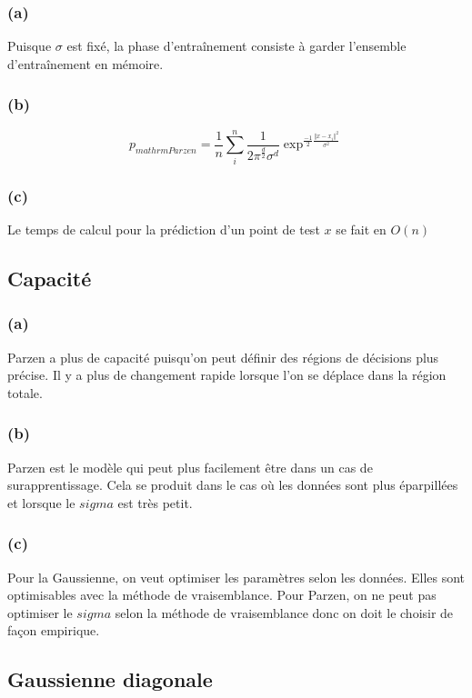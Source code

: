 \documentclass{article}
\begin{document}
	\subsubsection*{(a)}
	Puisque $\sigma$ est fixé, la phase d'entraînement consiste à garder l'ensemble d'entraînement en mémoire.
	\subsubsection*{(b)}
	\begin{equation}
	p_{mathrmParzen} =
	\frac{1}{n}\sum_{i}^{n}\frac{1}{2\pi^{\frac{d}{2}}\sigma^d}\exp^{\frac{-1}{2}\frac{\Vert x-x_i\Vert^2}{\sigma^2}}
	\end{equation}
	\subsubsection*{(c)}
	Le temps de calcul pour la prédiction d'un point de test $x$ se fait en $O(n)$
	
	\subsection{Capacité}
	
	\subsubsection*{(a)}
	Parzen a plus de capacité puisqu'on peut définir des régions de décisions plus précise. Il y a plus de changement rapide lorsque l'on se déplace dans la région totale.
	
	\subsubsection*{(b)}
	Parzen est le modèle qui peut plus facilement être dans un cas de surapprentissage. Cela se produit dans le cas où les données sont plus éparpillées et lorsque le $sigma$ est très petit.
	
	\subsubsection*{(c)}
	Pour la Gaussienne, on veut optimiser les paramètres selon les données. Elles sont optimisables avec la méthode de vraisemblance. Pour Parzen, on ne peut pas optimiser le $sigma$ selon la méthode de vraisemblance donc on doit le choisir de façon empirique.
	
	\subsection{Gaussienne diagonale}
	
\end{document}

